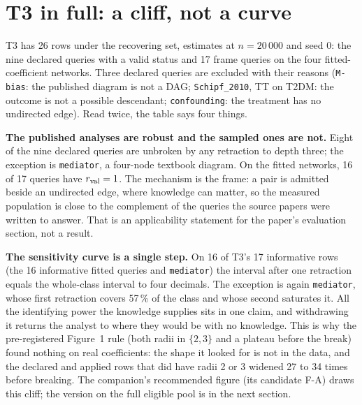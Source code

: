 
\begin{antes}
\end{antes}

\section{T3 in full: a cliff, not a curve}

T3 has 26 rows under the recovering set, estimates at $n = 20\,000$ and seed 0: the nine declared
queries with a valid status and 17 frame queries on the four fitted-coefficient networks. Three declared
queries are excluded with their reasons (\texttt{M-bias}: the published diagram is not a DAG;
\texttt{Schipf\_2010}, TT on T2DM: the outcome is not a possible descendant; \texttt{confounding}: the
treatment has no undirected edge). Read twice, the table says four things.

\textbf{The published analyses are robust and the sampled ones are not.} Eight of the nine declared
queries are unbroken by any retraction to depth three; the exception is \texttt{mediator}, a four-node
textbook diagram. On the fitted networks, 16 of 17 queries have $r_{\mathrm{val}} = 1$. The mechanism is the frame:
a pair is admitted beside an undirected edge, where knowledge can matter, so the measured population
is close to the complement of the queries the source papers were written to answer. That is an
applicability statement for the paper's evaluation section, not a result.

\textbf{The sensitivity curve is a single step.} On 16 of T3's 17 informative rows (the 16 informative
fitted queries and \texttt{mediator}) the interval after one retraction equals the whole-class interval
to four decimals. The exception is again
\texttt{mediator}, whose first retraction covers 57\,\% of the class and whose second saturates it. All
the identifying power the knowledge supplies sits in one claim, and withdrawing it returns the analyst
to where they would be with no knowledge. This is why the pre-registered Figure~1 rule (both radii in
$\{2, 3\}$ and a plateau before the break) found nothing on real coefficients: the shape it looked for
is not in the data, and the declared and applied rows that did have radii 2 or 3 widened 27 to 34 times
before breaking. The companion's recommended figure (its candidate F-A) draws this cliff; the
version on the full eligible pool is in the next section.

